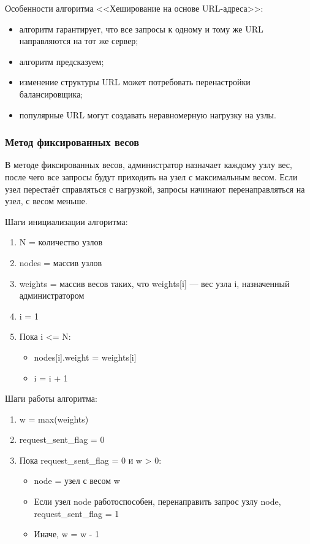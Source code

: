 Особенности алгоритма <<Хеширование на основе URL-адреса>>:
\begin{itemize}
    \item алгоритм гарантирует, что все запросы к одному и тому же URL направляются на тот же сервер;
    \item алгоритм предсказуем;
    \item изменение структуры URL может потребовать перенастройки балансировщика;
    \item популярные URL могут создавать неравномерную нагрузку на узлы.
\end{itemize}

\subsubsection{Метод фиксированных весов}

В методе фиксированных весов, администратор назначает каждому узлу вес, после чего все запросы будут приходить на узел с максимальным весом.
Если узел перестаёт справляться с нагрузкой, запросы начинают перенаправляться на узел, с весом меньше.

Шаги инициализации алгоритма:
\begin{enumerate}
    \item N = количество узлов
    \item nodes = массив узлов
    \item weights = массив весов таких, что weights[i] --- вес узла i, назначенный администратором
    \item i = 1
    \item Пока i <= N:
        \begin{itemize}
            \item nodes[i].weight = weights[i]
            \item i = i + 1
        \end{itemize}
\end{enumerate}

Шаги работы алгоритма:
\begin{enumerate}
    \item w = max(weights)
    \item request\_sent\_flag = 0
    \item Пока request\_sent\_flag = 0 и w > 0:
        \begin{itemize}
            \item node = узел с весом w
            \item Если узел node работоспособен, перенаправить запрос узлу node, request\_sent\_flag = 1
            \item Иначе, w = w - 1
        \end{itemize}
\end{enumerate}

